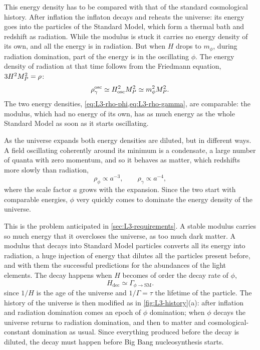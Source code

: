 This energy density has to be compared with that of the standard cosmological history. After inflation the inflaton decays and reheats the universe: its energy goes into the particles of the Standard Model, which form a thermal bath and redshift as radiation. While the modulus is stuck it carries no energy density of its own, and all the energy is in radiation. But when $H$ drops to $m_\phi$, during radiation domination, part of the energy is in the oscillating $\phi$. The energy density of radiation at that time follows from the Friedmann equation, $3H^2M_{P}^2 = \rho$:
\begin{equation}
  \rho_\gamma^{\text{osc}}\simeq H_{\text{osc}}^2M_{P}^2\simeq m_\phi^2M_{P}^2 .
  \label{eq:L3-rho-gamma}
\end{equation}
The two energy densities, \cref{eq:L3-rho-phi,eq:L3-rho-gamma}, are comparable: the modulus, which had no energy of its own, has as much energy as the whole Standard Model as soon as it starts oscillating.

As the universe expands both energy densities are diluted, but in different ways. A field oscillating coherently around its minimum is a condensate, a large number of quanta with zero momentum, and so it behaves as matter, which redshifts more slowly than radiation,
\begin{equation}
  \rho_\phi\propto a^{-3} ,\qquad \rho_\gamma\propto a^{-4} ,
  \label{eq:L3-redshift}
\end{equation}
where the scale factor $a$ grows with the expansion. Since the two start with comparable energies, $\phi$ very quickly comes to dominate the energy density of the universe.

This is the problem anticipated in \cref{sec:L3-requirements}. A stable modulus carries so much energy that it overcloses the universe, as too much dark matter. A modulus that decays into Standard Model particles converts all its energy into radiation, a huge injection of energy that dilutes all the particles present before, and with them the successful predictions for the abundances of the light elements. The decay happens when $H$ becomes of order the decay rate of $\phi$,
\begin{equation}
  H_{\text{dec}}\simeq\Gamma_{\phi\to\text{SM}} .
  \label{eq:L3-dec}
\end{equation}
since $1/H$ is the age of the universe and $1/\Gamma = \tau$ the lifetime of the particle. The history of the universe is then modified as in \cref{fig:L3-history}(a): after inflation and radiation domination comes an epoch of $\phi$ domination; when $\phi$ decays the universe returns to radiation domination, and then to matter and cosmological-constant domination as usual. Since everything produced before the decay is diluted, the decay must happen before Big Bang nucleosynthesis starts.

